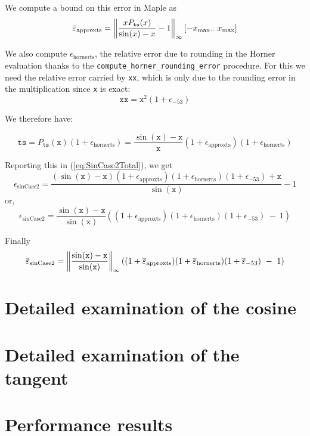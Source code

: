 We compute a bound on this error in Maple as 
$${\overline{\varepsilon}}_{\mathrm{approxts}} = \left\Vert \frac{xP_{\mathtt{ts}}(x)}{\sin(x)-x} -1 \right\Vert_{\infty}[-x_{\mathrm{max}}...x_{\mathrm{max}}]$$

We also compute $\epsilon_{\mathrm{hornerts}}$, the relative error due
to rounding in the Horner evaluation thanks to the
\texttt{compute\_horner\_rounding\_error} procedure. For this we need
the relative error carried by \texttt{xx}, which is only due to the
rounding error in the multiplication since \texttt{x} is exact:
$$\mathtt{xx}=\mathtt{x}^2(1+\epsilon_{-53})$$

We therefore have:

$$\mathtt{ts} = P_{\mathtt{ts}}(\mathtt{x})(1+\epsilon_{\mathrm{hornerts}}) = \frac{\sin(\mathtt{x})-\mathtt{x}}{\mathtt{x}}(1+\epsilon_{\mathrm{approxts}})(1+\epsilon_{\mathrm{hornerts}})$$

Reporting this in (\ref{eq:SinCase2Total}), we get 
\begin{equation*}
  \epsilon_{\mathrm{sinCase2}} = \frac{(\sin(\mathtt{x})-\mathtt{x})(1+\epsilon_{\mathrm{approxts}})(1+\epsilon_{\mathrm{hornerts}})(1+\epsilon_{-53}) + \mathtt{x}}{\sin(\mathtt{x})} -1
\end{equation*}
or,
\begin{equation*}
  \epsilon_{\mathrm{sinCase2}} =  \frac{\sin(\mathtt{x})-\mathtt{x}}{\sin(\mathtt{x})}\left((1+\epsilon_{\mathrm{approxts}})(1+\epsilon_{\mathrm{hornerts}})(1+\epsilon_{-53})\ -\ 1\right)
\end{equation*}

Finally
\begin{equation}
  \maxeps_{\mathrm{sinCase2}} =  \left\Vert\frac{\sin(\mathtt{x})-\mathtt{x}}{\sin(\mathtt{x})}\right\Vert_{\infty}((1+\maxeps_{\mathrm{approxts}})(1+\maxeps_{\mathrm{hornerts}})(1+\maxeps_{-53})\ -\ 1)
  \label{eq:SinCase2Total2}
\end{equation}
 



\section{Detailed examination of the cosine}
\section{Detailed examination of the tangent}


\section{Performance results}

